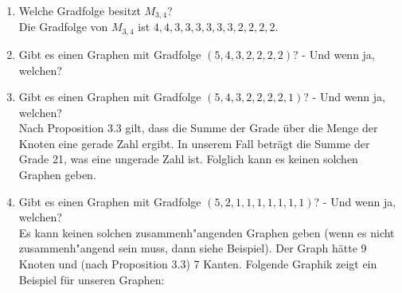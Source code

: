     \begin{enumerate}[label=(\alph*)]
        \item Welche Gradfolge besitzt $M_{3,4}$?\\
        Die Gradfolge von $M_{3,4}$ ist $4,4,3,3,3,3,3,3,2,2,2,2$.

        \item Gibt es einen Graphen mit Gradfolge $(5, 4, 3, 2, 2, 2, 2)$? - Und wenn ja, welchen?\\

        \item Gibt es einen Graphen mit Gradfolge $(5, 4, 3, 2, 2, 2, 2, 1)$? - Und wenn ja, welchen?\\
        Nach Proposition 3.3 gilt, dass die Summe der Grade über die Menge der Knoten eine gerade Zahl ergibt. 
        In unserem Fall beträgt die Summe der Grade 21, was eine ungerade Zahl ist. Folglich kann es 
        keinen solchen Graphen geben. 

        \item Gibt es einen Graphen mit Gradfolge $(5, 2, 1, 1, 1, 1, 1, 1, 1)$? - Und wenn ja, welchen?\\
        Es kann keinen solchen zusammenh"angenden Graphen geben (wenn es nicht zusammenh"angend sein muss, 
        dann siehe Beispiel). Der Graph hätte 9 Knoten und (nach Proposition 3.3) 7 Kanten. 
        Folgende Graphik zeigt ein Beispiel für unseren Graphen: \\\\
\end{enumerate}
